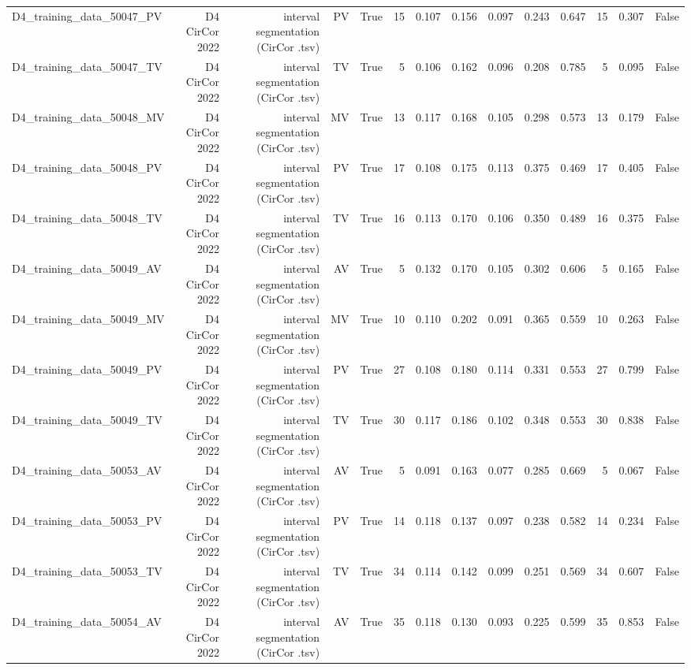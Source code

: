 \begin{table}[htbp]
\begin{tabular}{lrrrrrrrrrrrrr}
    D4\_training\_data\_50047\_PV & D4 CirCor 2022 & interval segmentation (CirCor .tsv) & PV & True & 15 & 0.107 & 0.156 & 0.097 & 0.243 & 0.647 & 15 & 0.307 & False \\
    D4\_training\_data\_50047\_TV & D4 CirCor 2022 & interval segmentation (CirCor .tsv) & TV & True & 5 & 0.106 & 0.162 & 0.096 & 0.208 & 0.785 & 5 & 0.095 & False \\
    D4\_training\_data\_50048\_MV & D4 CirCor 2022 & interval segmentation (CirCor .tsv) & MV & True & 13 & 0.117 & 0.168 & 0.105 & 0.298 & 0.573 & 13 & 0.179 & False \\
    D4\_training\_data\_50048\_PV & D4 CirCor 2022 & interval segmentation (CirCor .tsv) & PV & True & 17 & 0.108 & 0.175 & 0.113 & 0.375 & 0.469 & 17 & 0.405 & False \\
    D4\_training\_data\_50048\_TV & D4 CirCor 2022 & interval segmentation (CirCor .tsv) & TV & True & 16 & 0.113 & 0.170 & 0.106 & 0.350 & 0.489 & 16 & 0.375 & False \\
    D4\_training\_data\_50049\_AV & D4 CirCor 2022 & interval segmentation (CirCor .tsv) & AV & True & 5 & 0.132 & 0.170 & 0.105 & 0.302 & 0.606 & 5 & 0.165 & False \\
    D4\_training\_data\_50049\_MV & D4 CirCor 2022 & interval segmentation (CirCor .tsv) & MV & True & 10 & 0.110 & 0.202 & 0.091 & 0.365 & 0.559 & 10 & 0.263 & False \\
    D4\_training\_data\_50049\_PV & D4 CirCor 2022 & interval segmentation (CirCor .tsv) & PV & True & 27 & 0.108 & 0.180 & 0.114 & 0.331 & 0.553 & 27 & 0.799 & False \\
    D4\_training\_data\_50049\_TV & D4 CirCor 2022 & interval segmentation (CirCor .tsv) & TV & True & 30 & 0.117 & 0.186 & 0.102 & 0.348 & 0.553 & 30 & 0.838 & False \\
    D4\_training\_data\_50053\_AV & D4 CirCor 2022 & interval segmentation (CirCor .tsv) & AV & True & 5 & 0.091 & 0.163 & 0.077 & 0.285 & 0.669 & 5 & 0.067 & False \\
    D4\_training\_data\_50053\_PV & D4 CirCor 2022 & interval segmentation (CirCor .tsv) & PV & True & 14 & 0.118 & 0.137 & 0.097 & 0.238 & 0.582 & 14 & 0.234 & False \\
    D4\_training\_data\_50053\_TV & D4 CirCor 2022 & interval segmentation (CirCor .tsv) & TV & True & 34 & 0.114 & 0.142 & 0.099 & 0.251 & 0.569 & 34 & 0.607 & False \\
    D4\_training\_data\_50054\_AV & D4 CirCor 2022 & interval segmentation (CirCor .tsv) & AV & True & 35 & 0.118 & 0.130 & 0.093 & 0.225 & 0.599 & 35 & 0.853 & False \\

\end{tabular}
\end{table}
